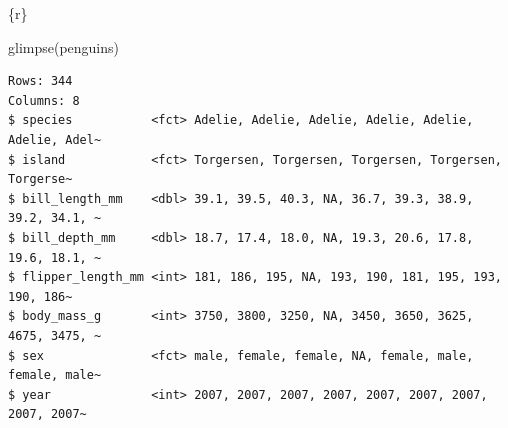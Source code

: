 \documentclass[
  letterpaper,
  DIV=11,
  numbers=noendperiod]{scrreprt}
\newenvironment{Shaded}{\begin{snugshade}}{\end{snugshade}}
\newcommand{\FunctionTok}[1]{\textcolor[rgb]{0.28,0.35,0.67}{#1}}
\newcommand{\InformationTok}[1]{\textcolor[rgb]{0.37,0.37,0.37}{#1}}
\newcommand{\NormalTok}[1]{\textcolor[rgb]{0.00,0.23,0.31}{#1}}
\begin{document}
\begin{tcolorbox}[enhanced jigsaw, breakable, colback=white, bottomrule=.15mm, leftrule=.75mm, colframe=quarto-callout-note-color-frame, arc=.35mm, rightrule=.15mm, toprule=.15mm, left=2mm, opacityback=0]
\begin{Shaded}
\begin{Highlighting}[]
\InformationTok{\textasciigrave{}\textasciigrave{}\textasciigrave{}\{r\}}

\FunctionTok{glimpse}\NormalTok{(penguins)}
\InformationTok{\textasciigrave{}\textasciigrave{}\textasciigrave{}}
\end{Highlighting}
\end{Shaded}

\begin{verbatim}
Rows: 344
Columns: 8
$ species           <fct> Adelie, Adelie, Adelie, Adelie, Adelie, Adelie, Adel~
$ island            <fct> Torgersen, Torgersen, Torgersen, Torgersen, Torgerse~
$ bill_length_mm    <dbl> 39.1, 39.5, 40.3, NA, 36.7, 39.3, 38.9, 39.2, 34.1, ~
$ bill_depth_mm     <dbl> 18.7, 17.4, 18.0, NA, 19.3, 20.6, 17.8, 19.6, 18.1, ~
$ flipper_length_mm <int> 181, 186, 195, NA, 193, 190, 181, 195, 193, 190, 186~
$ body_mass_g       <int> 3750, 3800, 3250, NA, 3450, 3650, 3625, 4675, 3475, ~
$ sex               <fct> male, female, female, NA, female, male, female, male~
$ year              <int> 2007, 2007, 2007, 2007, 2007, 2007, 2007, 2007, 2007~
\end{verbatim}

\end{tcolorbox}
\end{document}
